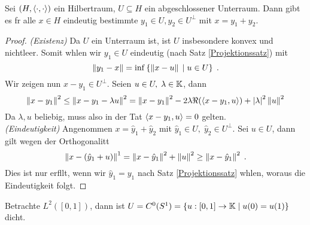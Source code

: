 	\begin{theorem}
		Sei \((H, \left\langle\cdot, \cdot\right\rangle)\) ein Hilbertraum, \(U\subseteq H\) ein abgeschlossener Unterraum.  Dann gibt es f\us r alle \(x\in H\) eindeutig bestimmte \(y_1 \in U, y_2 \in U^\perp\) mit \(x = y_1 + y_2\).
	\end{theorem}
	\begin{proof}
		\textit{(Existenz)} Da \(U\) ein Unterraum ist, ist $U$ insbesondere konvex und nichtleer. Somit w\as hlen wir \(y_1 \in U\) eindeutig (nach Satz \ref{Projektionssatz}) mit
		\[\left\lVert y_1 -x\right\rVert = \inf\left\{\left\lVert x-u\right\rVert\;\vert\; u \in U\right\}\;.\]
		Wir zeigen nun \(x-y_1 \in U^\perp\). Seien \(u\in U,\; \lambda \in \mathbb{K}\), dann 
		\[\left\lVert x-y_1\right\rVert^2 \leq \left\lVert x-y_1 -\lambda u\right\rVert^2 = \left\lVert x-y_1\right\rVert^2 -2 \lambda\Re(\left\langle x-y_1, u\right\rangle) + \left\lvert \lambda \right\rvert^2 \left\lVert u\right\rVert^2\]
		Da \(\lambda, u\) beliebig, muss also in der Tat \(\left\langle x-y_1,u\right\rangle = 0\) gelten.\\
		\textit{(Eindeutigkeit)} Angenommen \(x = \hat y_1 + \hat y_2\) mit \(\hat y_1 \in U,\; \hat y_2 \in U^\perp\). Sei \(u \in U\), dann gilt wegen der Orthogonalit\as t
		\[\left\lVert x-(\hat y_1 +u)\right\rVert^1 = \left\lVert x-\hat y_1\right\rVert^2 + \left\lVert u\right\rVert^2 \geq \left\lVert x-\hat y_1\right\rVert^2\;.\]
		Dies ist nur erf\us llt, wenn wir \(\hat y_1 = y_1\) nach Satz  \ref{Projektionssatz} w\as hlen, woraus die Eindeutigkeit folgt.
	\end{proof}
	
	\begin{ex}
		Betrachte \(L^2([0,1])\), dann ist \(U = C^0(S^1) = \left\{u:[0,1]\to \mathbb{K}\;\vert\; u(0) = u(1)\right\}\) dicht.
	\end{ex}

